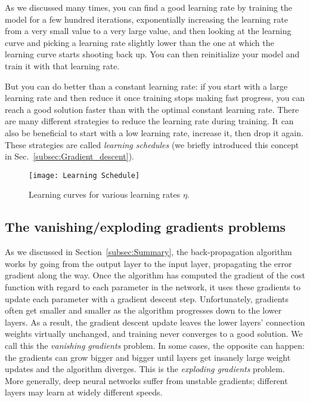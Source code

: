 As we discussed many times, you can find a good learning rate by training the model for a few hundred iterations, exponentially increasing the learning rate from a very small value to a very large value, and then looking at the learning curve and picking a learning rate slightly lower than the one at which the learning curve starts shooting back up. You can then reinitialize your model and train it with that learning rate.

But you can do better than a constant learning rate: if you start with a large learning rate and then reduce it once training stops making fast progress, you can reach a good solution faster than with the optimal constant learning rate. There are many different strategies to reduce the learning rate during training. It can also be beneficial to start with a low learning rate, increase it, then drop it again. These strategies are called \emph{learning schedules} (we briefly introduced this concept in Sec.~\ref{subsec:Gradient_descent}).
\begin{figure}[h!t]
\centering
\texttt{[image: Learning Schedule]}
\caption{Learning curves for various learning rates $\eta$.}\label{LearningSchedule}
\end{figure}
\subsection{The vanishing/exploding gradients problems}
As we discussed in Section~\ref{subsec:Summary}, the back-propagation algorithm works by going from the output layer to the input layer, propagating the error gradient along the way. Once the algorithm has computed the gradient of the cost function with regard to each parameter in the network, it uses these gradients to update each parameter with a gradient descent step. Unfortunately, gradients often get smaller and smaller as the algorithm progresses down to the lower layers. As a result, the gradient descent update leaves the lower layers' connection weights virtually unchanged, and training never converges to a good solution. We call this the \emph{vanishing gradients} problem. In some cases, the opposite can happen: the gradients can grow bigger and bigger until layers get insanely large weight updates and the algorithm diverges. This is the \emph{exploding gradients} problem. More generally, deep neural networks suffer from unstable gradients; different layers may learn at widely different speeds.


